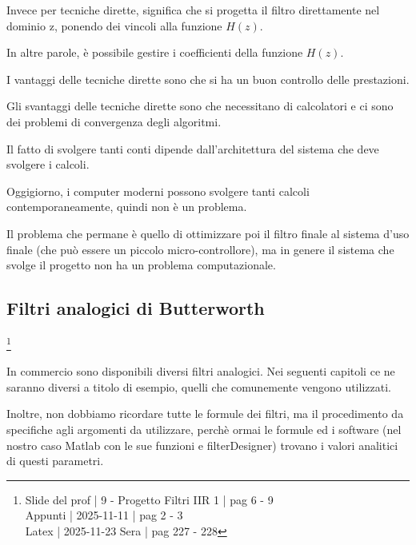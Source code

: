Invece per tecniche dirette, significa che si progetta il filtro direttamente nel dominio z, ponendo dei vincoli alla funzione $H \left( z\right)$. \newline 

In altre parole, è possibile gestire i coefficienti della funzione $H \left(z\right)$. \newline 

I vantaggi delle tecniche dirette sono che si ha un buon controllo delle prestazioni. \newline 

Gli svantaggi delle tecniche dirette sono che necessitano di calcolatori e ci sono dei problemi di convergenza degli algoritmi. \newline 

\begin{tcolorbox}
    Il fatto di svolgere tanti conti dipende dall'architettura del sistema che deve svolgere i calcoli. \newline 

    Oggigiorno, i computer moderni possono svolgere tanti calcoli contemporaneamente, quindi non è un problema. \newline 

    Il problema che permane è quello di ottimizzare poi il filtro finale al sistema d'uso finale (che può essere un piccolo micro-controllore), 
    ma in genere il sistema che svolge il progetto non ha un problema computazionale. 
\end{tcolorbox}

\newpage 

\subsection{Filtri analogici di Butterworth}

\footnote{ 
    Slide del prof | 9 - Progetto Filtri IIR 1 | pag 6 - 9\\
    Appunti | 2025-11-11 | pag 2 - 3 \\
    Latex | 2025-11-23 Sera | pag 227 - 228   
} 

\begin{tcolorbox}
    In commercio sono disponibili diversi filtri analogici. Nei seguenti capitoli ce ne saranno diversi a titolo di esempio, quelli che comunemente vengono utilizzati. \newline

    Inoltre, non dobbiamo ricordare tutte le formule dei filtri, ma il procedimento da specifiche agli argomenti da utilizzare, 
    perchè ormai le formule ed i software (nel nostro caso Matlab con le sue funzioni e filterDesigner) trovano i valori analitici di questi parametri. 
\end{tcolorbox}

